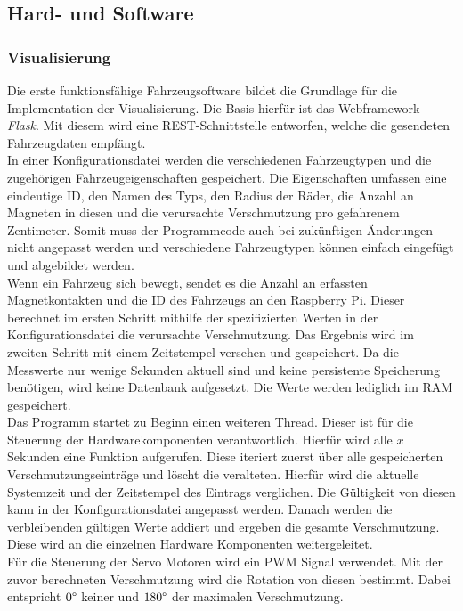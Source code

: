 \documentclass[.../Dokumentation.tex]{subfiles}
\begin{document}
    \subsection{Hard- und Software}
    \label{sec-ita3-hardware}
    \subsubsection*{Visualisierung}
    Die erste funktionsfähige Fahrzeugsoftware bildet die Grundlage für die Implementation der Visualisierung. Die Basis hierfür ist das Webframework \emph{Flask}. Mit diesem wird eine REST-Schnittstelle entworfen, welche die gesendeten Fahrzeugdaten empfängt. \\
    In einer Konfigurationsdatei werden die verschiedenen Fahrzeugtypen und die zugehörigen Fahrzeugeigenschaften gespeichert. Die Eigenschaften umfassen eine eindeutige ID, den Namen des Typs, den Radius der Räder, die Anzahl an Magneten in diesen und die verursachte Verschmutzung pro gefahrenem Zentimeter. Somit muss der Programmcode auch bei zukünftigen Änderungen nicht angepasst werden und verschiedene Fahrzeugtypen können einfach eingefügt und abgebildet werden.\\
    Wenn ein Fahrzeug sich bewegt, sendet es die Anzahl an erfassten Magnetkontakten und die ID des Fahrzeugs an den Raspberry Pi. Dieser berechnet im ersten Schritt mithilfe der spezifizierten Werten in der Konfigurationsdatei die verursachte Verschmutzung. Das Ergebnis wird im zweiten Schritt mit einem Zeitstempel versehen und gespeichert. Da die Messwerte nur wenige Sekunden aktuell sind und keine persistente Speicherung benötigen, wird keine Datenbank aufgesetzt. Die Werte werden lediglich im RAM gespeichert.\\
    Das Programm startet zu Beginn einen weiteren Thread. Dieser ist für die Steuerung der Hardwarekomponenten verantwortlich. Hierfür wird alle $x$ Sekunden eine Funktion aufgerufen. Diese iteriert zuerst über alle gespeicherten Verschmutzungseinträge und löscht die veralteten. Hierfür wird die aktuelle Systemzeit und der Zeitstempel des Eintrags verglichen. Die Gültigkeit von diesen kann in der Konfigurationsdatei angepasst werden. Danach werden die verbleibenden gültigen Werte addiert und ergeben die gesamte Verschmutzung. Diese wird an die einzelnen Hardware Komponenten weitergeleitet.\\
    Für die Steuerung der Servo Motoren wird ein PWM Signal verwendet. Mit der zuvor berechneten Verschmutzung wird die Rotation von diesen bestimmt. Dabei entspricht $0 \degree$ keiner und $180 \degree$ der maximalen Verschmutzung.\\
\end{document}
